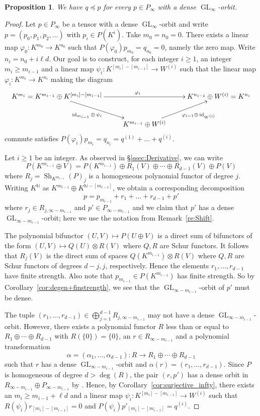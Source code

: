 \documentclass{amsart}
\theoremstyle{plain}
\newtheorem{prop}[thm]{Proposition}
\theoremstyle{definition}
\newcommand{\NN}{\mathbb{N}}
\DeclareMathOperator{\id}{id}
\renewcommand{\phi}{\varphi}
\DeclareMathOperator{\GL}{GL}
\DeclareMathOperator{\Sh}{Sh}
\begin{document}
\begin{prop} \label{prop:Specialising}
We have $q \preceq p$ for every $p \in P_\infty$ with a dense
$\GL_\infty$-orbit.
\end{prop}
\begin{proof}
Let $p \in P_\infty$ be a tensor with a dense
$\GL_\infty$-orbit and write $p=(p_0,p_1,p_2,\ldots)$ with $p_i \in P(K^{i})$. Take $m_0=n_0=0$. There exists a linear map $\phi_0\colon K^{m_0}\to K^{n_0}$ such that $P(\phi_0)p_{m_0}=q_{n_0}=0$, namely the zero map. Write $n_i=n_0+i\ell d$. Our goal is to construct, for each integer $i\geq 1$, an integer $m_i\geq m_{i-1}$ and a linear map $\psi_i\colon K^{[m_i]-[m_{i-1}]}\to W^{(i)}$ such that the linear map $\phi_i\colon K^{m_i}\to K^{n_i}$ making the diagram
\[ \xymatrix{
K^{m_i}=K^{m_{i-1}}\oplus K^{[m_i]-[m_{i-1}]}\ar[rr]^{\phi_i} \ar[dr]_{\id_{m_{i-1}}\oplus\,\psi_i\phantom{hello}} && K^{n_{i-1}}\oplus W^{(i)}=K^{n_i}\\
& K^{m_{i-1}}\oplus W^{(i)}\ar[ru]_{\phantom{world}\phi_{i-1}\oplus\,\id_{W^{(i)}}}
} \]
commute satisfies $P(\phi_i)p_{m_i}=q_{n_i}=q^{(1)}+\ldots+q^{(i)}$.

Let $i\geq 1$ be an integer. As observed in \S\ref{ssec:Derivative}, we can write
\[
P(K^{m_{i-1}} \oplus V) = P(K^{m_{i-1}})\oplus R_1(V)\oplus\cdots\oplus R_{d-1}(V)\oplus P(V)
\]
where $R_j=\Sh_{K^{m_{i-1}}}(P)_j$ is a homogeneous polynomial functor of degree $j$.
Writing $K^\NN$ as $K^{m_{i-1}} \oplus K^{\NN-[m_{i-1}]}$, we obtain a
corresponding decomposition
\[
p=p_{m_{i-1}} + r_1 + \ldots + r_{d-1} + p'
\]
where $r_j\in R_{j,\infty-m_{i-1}}$ and $p'\in P_{\infty-m_{i-1}}$ and we claim that $p'$ has a dense $\GL_{\infty-m_{i-1}}$-orbit; here we use
the notation from Remark~\ref{re:Shift}.

The polynomial bifunctor $(U,V)\mapsto P(U\oplus V)$ is a direct sum of bifunctors of the form $(U,V)\mapsto Q(U)\otimes R(V)$ where $Q,R$ are Schur functors. It follows that $R_j(V)$ is the direct sum of spaces $Q(K^{m_{i-1}})\otimes R(V)$ where $Q,R$ are Schur functors of degrees $d-j,j$, respectively. Hence the elements $r_1,\ldots,r_{d-1}$ have finite strength. Also note that $p_{m_{i-1}}\in P(K^{m_{i-1}})$ has finite strength.
So by Corollary~\ref{cor:degen+finstrength}, we see that the $\GL_{\infty-m_{i-1}}$-orbit of $p'$ must be dense.

The tuple $(r_1,\ldots,r_{d-1}) \in \bigoplus_{j=1}^{d-1}R_{j,\infty-m_{i-1}}$ may not have a dense $\GL_{\infty-m_{i-1}}$-orbit. However,
there exists a polynomial functor $R$ less than or equal to $R_1 \oplus
\cdots \oplus R_{d-1}$ with $R(\{0\})=\{0\}$, an $r \in R_{\infty-m_{i-1}}$ and
a polynomial transformation
\[
\alpha=(\alpha_1,\ldots,\alpha_{d-1})\colon R \to R_1 \oplus \cdots \oplus R_{d-1}
\]
such that $r$ has a dense $\GL_{\infty-m_{i-1}}$-orbit and
$\alpha(r)=(r_1,\ldots,r_{d-1})$. Since $P$ is homogeneous of degree $d>\deg(R)$, the pair $(r,p')$ has a dense orbit in $R_{\infty-m_{i-1}} \oplus P_{\infty-m_{i-1}}$ by \cite[Lemma 4.5.3]{B:thesis}. Hence, by Corollary~\ref{cor:surjective_infty}, there exists
an $m_i \geq m_{i-1} + \ell d$ and a linear map $\psi_i\colon
K^{[m_i]-[m_{i-1}]} \to W^{(i)}$ such that
$R(\psi_i)r_{[m_i]-[m_{i-1}]} = 0$ and $P(\psi_i)p'_{[m_i]-[m_{i-1}]}=q^{(i)}$.


\end{proof}
\end{document}
